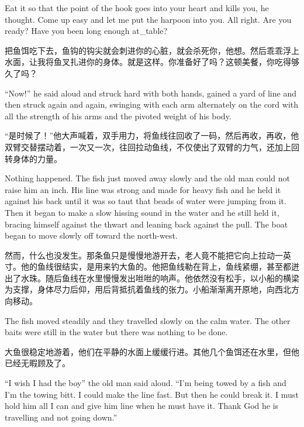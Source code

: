 \begin{paracol}{2}
Eat it so that the point of the hook goes into your heart and kills you, he
thought. Come up easy and let me put the harpoon into you. All right. Are
you ready? Have you been long enough \gls{at_table}?

\switchcolumn

把鱼饵吃下去，鱼钩的钩尖就会刺进你的心脏，就会杀死你，他想。然后乖乖浮上水面，让我将鱼叉扎进你的身体。就是这样。你准备好了吗？这顿美餐，你吃得够久了吗？

\switchcolumn*

``Now!'' he said aloud and struck hard with both hands, \gls{gained} a yard
of line and then struck again and again, swinging with each arm
\gls{alternately} on the cord with all the strength of his arms and the
\gls{pivoted} weight of his body.

\switchcolumn

“是时候了！”他大声喊着，双手用力，将鱼线往回收了一码，然后再收，再收，他双臂交替摆动着，一次又一次，往回拉动鱼线，不仅使出了双臂的力气，还加上回转身体的力量。

\switchcolumn*

Nothing happened. The fish just moved away slowly and the old man could not
raise him an \gls{inch}. His line was strong and made for heavy fish and he
held it against his back until it was so taut that \glspl{bead} of
water were jumping from it. Then it began to make a slow hissing sound in
the water and he still held it, \gls{bracing} himself against the thwart and
leaning back against the pull. The boat began to move slowly off toward the
north-west.

\switchcolumn

然而，什么也没发生。那条鱼只是慢慢地游开去，老人竟不能把它向上拉动一英寸。他的鱼线很结实，是用来钓大鱼的。他把鱼线勒在背上，鱼线紧绷，甚至都迸出了水珠。随后鱼线在水里慢慢发出咝咝的响声。他依然没有松手，以小船的横梁为支撑，身体尽力后仰，用后背抵抗着鱼线的张力。小船渐渐离开原地，向西北方向移动。

\switchcolumn*

The fish moved steadily and they travelled slowly on the \gls{calm} water. The
other baits were still in the water but there was nothing to be done.

\switchcolumn

大鱼很稳定地游着，他们在平静的水面上缓缓行进。其他几个鱼饵还在水里，但他已经无暇顾及了。

\switchcolumn*

``I wish I had the boy'' the old man said aloud. ``I'm being \gls{towed} by
a fish and I'm the towing \gls{bitt}. I could make the line fast. But then
he could break it. I must hold him all I can and give him line when he must
have it. Thank God he is travelling and not going down.''


\end{paracol}
